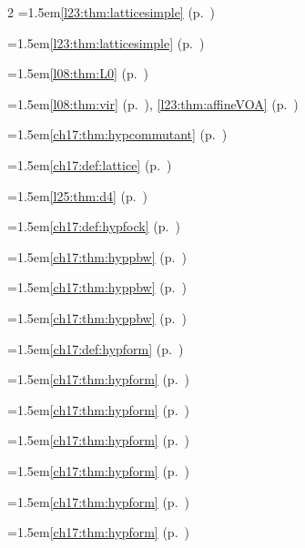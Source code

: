 \begin{multicols}{2}
\hangindent=1.5em\quad \ref{l23:thm:latticesimple} (p.~\pageref{l23:thm:latticesimple})\par
\hangindent=1.5em\quad \ref{l23:thm:latticesimple} (p.~\pageref{l23:thm:latticesimple})\par
\hangindent=1.5em\quad \ref{l08:thm:L0} (p.~\pageref{l08:thm:L0})\par
\hangindent=1.5em\quad \ref{l08:thm:vir} (p.~\pageref{l08:thm:vir}), \ref{l23:thm:affineVOA} (p.~\pageref{l23:thm:affineVOA})\par
\hangindent=1.5em\quad \ref{ch17:thm:hypcommutant} (p.~\pageref{ch17:thm:hypcommutant})\par
\hangindent=1.5em\quad \ref{ch17:def:lattice} (p.~\pageref{ch17:def:lattice})\par
\hangindent=1.5em\quad \ref{l25:thm:d4} (p.~\pageref{l25:thm:d4})\par
\hangindent=1.5em\quad \ref{ch17:def:hypfock} (p.~\pageref{ch17:def:hypfock})\par
\hangindent=1.5em\quad \ref{ch17:thm:hyppbw} (p.~\pageref{ch17:thm:hyppbw})\par
\hangindent=1.5em\quad \ref{ch17:thm:hyppbw} (p.~\pageref{ch17:thm:hyppbw})\par
\hangindent=1.5em\quad \ref{ch17:thm:hyppbw} (p.~\pageref{ch17:thm:hyppbw})\par
\hangindent=1.5em\quad \ref{ch17:def:hypform} (p.~\pageref{ch17:def:hypform})\par
\hangindent=1.5em\quad \ref{ch17:thm:hypform} (p.~\pageref{ch17:thm:hypform})\par
\hangindent=1.5em\quad \ref{ch17:thm:hypform} (p.~\pageref{ch17:thm:hypform})\par
\hangindent=1.5em\quad \ref{ch17:thm:hypform} (p.~\pageref{ch17:thm:hypform})\par
\hangindent=1.5em\quad \ref{ch17:thm:hypform} (p.~\pageref{ch17:thm:hypform})\par
\hangindent=1.5em\quad \ref{ch17:thm:hypform} (p.~\pageref{ch17:thm:hypform})\par
\hangindent=1.5em\quad \ref{ch17:thm:hypform} (p.~\pageref{ch17:thm:hypform})\par

\end{multicols}

